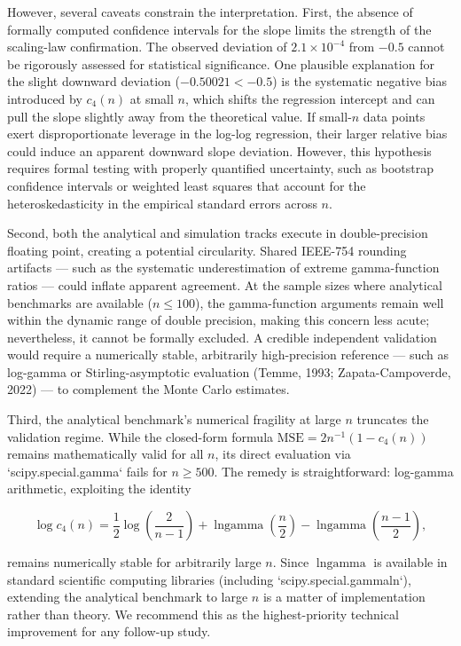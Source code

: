 \documentclass[11pt]{article}
\begin{document}
However, several caveats constrain the interpretation. First, the absence of formally computed confidence intervals for the slope limits the strength of the scaling-law confirmation. The observed deviation of $2.1 \times 10^{-4}$ from $-0.5$ cannot be rigorously assessed for statistical significance. One plausible explanation for the slight downward deviation ($-0.50021 < -0.5$) is the systematic negative bias introduced by $c_4(n)$ at small $n$, which shifts the regression intercept and can pull the slope slightly away from the theoretical value. If small-$n$ data points exert disproportionate leverage in the log-log regression, their larger relative bias could induce an apparent downward slope deviation. However, this hypothesis requires formal testing with properly quantified uncertainty, such as bootstrap confidence intervals or weighted least squares that account for the heteroskedasticity in the empirical standard errors across $n$.

Second, both the analytical and simulation tracks execute in double-precision floating point, creating a potential circularity. Shared IEEE-754 rounding artifacts — such as the systematic underestimation of extreme gamma-function ratios — could inflate apparent agreement. At the sample sizes where analytical benchmarks are available ($n \leq 100$), the gamma-function arguments remain well within the dynamic range of double precision, making this concern less acute; nevertheless, it cannot be formally excluded. A credible independent validation would require a numerically stable, arbitrarily high-precision reference — such as log-gamma or Stirling-asymptotic evaluation (Temme, 1993; Zapata-Campoverde, 2022) — to complement the Monte Carlo estimates.

Third, the analytical benchmark's numerical fragility at large $n$ truncates the validation regime. While the closed-form formula $\mathrm{MSE} = 2n^{-1}(1 - c_4(n))$ remains mathematically valid for all $n$, its direct evaluation via `scipy.special.gamma` fails for $n \geq 500$. The remedy is straightforward: log-gamma arithmetic, exploiting the identity

$$\log c_4(n) = \frac{1}{2}\log\!\left(\frac{2}{n-1}\right) + \operatorname{lngamma}\!\left(\frac{n}{2}\right) - \operatorname{lngamma}\!\left(\frac{n-1}{2}\right),$$

remains numerically stable for arbitrarily large $n$. Since $\operatorname{lngamma}$ is available in standard scientific computing libraries (including `scipy.special.gammaln`), extending the analytical benchmark to large $n$ is a matter of implementation rather than theory. We recommend this as the highest-priority technical improvement for any follow-up study.
\end{document}
